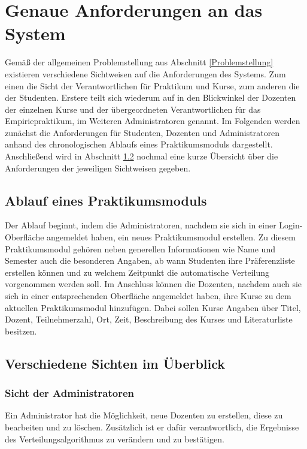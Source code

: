 \documentclass[12pt,a4paper]{article}
\begin{document}
    \section{Genaue Anforderungen an das System}
        Gemäß der allgemeinen Problemstellung aus Abschnitt \ref{Problemstellung} existieren verschiedene Sichtweisen auf die Anforderungen des Systems.
        Zum einen die Sicht der Verantwortlichen für Praktikum und Kurse, zum anderen die der Studenten.
        Erstere teilt sich wiederum auf in den Blickwinkel der Dozenten der einzelnen Kurse und der übergeordneten Verantwortlichen für das Empiriepraktikum, im Weiteren Administratoren genannt.
        Im Folgenden werden zunächst die Anforderungen für Studenten, Dozenten und Administratoren anhand des chronologischen Ablaufs eines Praktikumsmoduls dargestellt.
        Anschließend wird in Abschnitt \ref{Sichten} nochmal eine kurze Übersicht über die Anforderungen der jeweiligen Sichtweisen gegeben.
        
        \subsection{Ablauf eines Praktikumsmoduls}
            Der Ablauf beginnt, indem die Administratoren, nachdem sie sich in einer Login-Oberfläche angemeldet haben, ein neues Praktikumsmodul erstellen.
            Zu diesem Praktikumsmodul gehören neben generellen Informationen wie Name und Semester auch die besonderen Angaben, ab wann Studenten ihre Präferenzliste erstellen können und zu welchem Zeitpunkt die automatische Verteilung vorgenommen werden soll.
            Im Anschluss können die Dozenten, nachdem auch sie sich in einer entsprechenden Oberfläche angemeldet haben, ihre Kurse zu dem aktuellen Praktikumsmodul hinzufügen.
            Dabei sollen Kurse Angaben über Titel, Dozent, Teilnehmerzahl, Ort, Zeit, Beschreibung des Kurses und Literaturliste besitzen.
                    
        \subsection{Verschiedene Sichten im Überblick}
        \label{Sichten}
                    
            \subsubsection{Sicht der Administratoren}
            Ein Administrator hat die Möglichkeit, neue Dozenten zu erstellen, diese zu bearbeiten und zu löschen.
            Zusätzlich ist er dafür verantwortlich, die Ergebnisse des Verteilungsalgorithmus zu verändern und zu bestätigen.
                 
\end{document}

